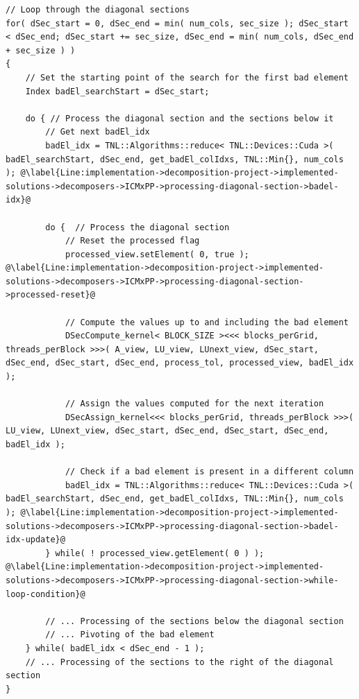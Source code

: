\begin{lstlisting}
// Loop through the diagonal sections
for( dSec_start = 0, dSec_end = min( num_cols, sec_size ); dSec_start < dSec_end; dSec_start += sec_size, dSec_end = min( num_cols, dSec_end + sec_size ) )
{
	// Set the starting point of the search for the first bad element
	Index badEl_searchStart = dSec_start;
	
	do { // Process the diagonal section and the sections below it
		// Get next badEl_idx
		badEl_idx = TNL::Algorithms::reduce< TNL::Devices::Cuda >( badEl_searchStart, dSec_end, get_badEl_colIdxs, TNL::Min{}, num_cols ); @\label{Line:implementation->decomposition-project->implemented-solutions->decomposers->ICMxPP->processing-diagonal-section->badel-idx}@
		
		do {  // Process the diagonal section
			// Reset the processed flag
			processed_view.setElement( 0, true ); @\label{Line:implementation->decomposition-project->implemented-solutions->decomposers->ICMxPP->processing-diagonal-section->processed-reset}@
			
			// Compute the values up to and including the bad element
			DSecCompute_kernel< BLOCK_SIZE ><<< blocks_perGrid, threads_perBlock >>>( A_view, LU_view, LUnext_view, dSec_start, dSec_end, dSec_start, dSec_end, process_tol, processed_view, badEl_idx );
			
			// Assign the values computed for the next iteration
			DSecAssign_kernel<<< blocks_perGrid, threads_perBlock >>>( LU_view, LUnext_view, dSec_start, dSec_end, dSec_start, dSec_end, badEl_idx );
			
			// Check if a bad element is present in a different column
			badEl_idx = TNL::Algorithms::reduce< TNL::Devices::Cuda >( badEl_searchStart, dSec_end, get_badEl_colIdxs, TNL::Min{}, num_cols ); @\label{Line:implementation->decomposition-project->implemented-solutions->decomposers->ICMxPP->processing-diagonal-section->badel-idx-update}@
		} while( ! processed_view.getElement( 0 ) ); @\label{Line:implementation->decomposition-project->implemented-solutions->decomposers->ICMxPP->processing-diagonal-section->while-loop-condition}@
		
		// ... Processing of the sections below the diagonal section
		// ... Pivoting of the bad element
	} while( badEl_idx < dSec_end - 1 );
	// ... Processing of the sections to the right of the diagonal section
}
\end{lstlisting}

